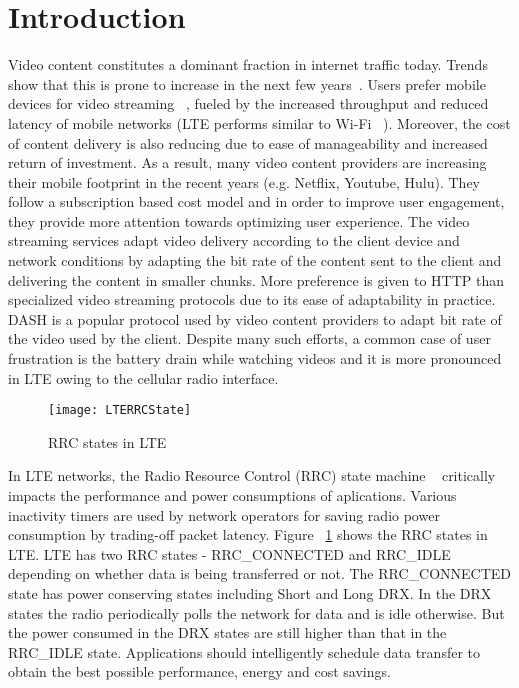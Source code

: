 \section{Introduction}
Video content constitutes a dominant fraction in internet traffic today. Trends show that this is prone to increase in the next few years~\cite{cisco_vid_stat}.
Users prefer mobile devices for video streaming ~\cite{cisco_vid_stat}, fueled by the increased throughput and reduced latency of mobile networks (LTE performs similar to Wi-Fi ~\cite{LTEPaper}).
Moreover, the cost of content delivery is also reducing due to ease of manageability and increased return of investment. As a result, many video content providers are increasing their mobile footprint in the recent years (e.g. Netflix, Youtube, Hulu). 
They follow a subscription based cost model and in order to improve user engagement, they provide more attention towards optimizing user experience. The video streaming services adapt video delivery according to the client device and network conditions by adapting the bit rate of the content sent to the client and delivering the content in smaller chunks. 
More preference is given to HTTP than specialized video streaming protocols due to its ease of adaptability in practice.  
DASH is a popular protocol used by video content providers to adapt bit rate of the video used by the client. Despite many such efforts, a common case of user frustration is the battery drain while watching videos and it is more pronounced in LTE owing to the cellular radio interface. 
 
\begin{figure}
\centering
\texttt{[image: LTERRCState]}
\caption{RRC states in LTE}
\label{fig:LTERRCState}
\end{figure}
In LTE networks, the Radio Resource Control (RRC) state machine ~\cite{LTEPaper} critically impacts the performance and power consumptions of aplications. Various inactivity timers are used by network operators for saving radio power consumption by trading-off packet latency. Figure ~\ref{fig:LTERRCState} shows the RRC states in LTE. LTE has two RRC states - RRC\_CONNECTED and RRC\_IDLE depending on whether data is being transferred or not. The RRC\_CONNECTED state has power conserving states including Short and Long DRX. In the DRX states the radio periodically polls the network for data and is idle otherwise. But the power consumed in the DRX states are still higher than that in the RRC\_IDLE state.
Applications should intelligently schedule data transfer to obtain the best possible performance, energy and cost savings. 


